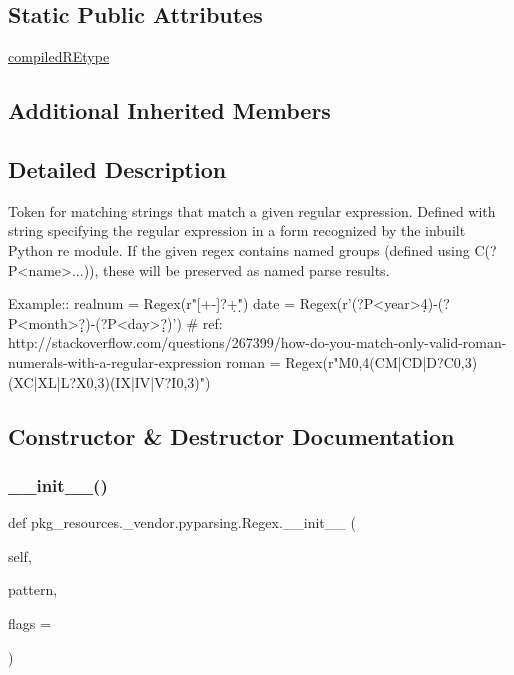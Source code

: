 \subsection*{Static Public Attributes}
\begin{DoxyCompactItemize}
\item 
\hyperlink{classpkg__resources_1_1__vendor_1_1pyparsing_1_1Regex_acf52ddb23c1ec08f8c580c6e28c49bc5}{compiled\+R\+Etype}
\end{DoxyCompactItemize}
\subsection*{Additional Inherited Members}


\subsection{Detailed Description}
\begin{DoxyVerb}Token for matching strings that match a given regular expression.
Defined with string specifying the regular expression in a form recognized by the inbuilt Python re module.
If the given regex contains named groups (defined using C{(?P<name>...)}), these will be preserved as 
named parse results.

Example::
    realnum = Regex(r"[+-]?\d+\.\d*")
    date = Regex(r'(?P<year>\d{4})-(?P<month>\d\d?)-(?P<day>\d\d?)')
    # ref: http://stackoverflow.com/questions/267399/how-do-you-match-only-valid-roman-numerals-with-a-regular-expression
    roman = Regex(r"M{0,4}(CM|CD|D?C{0,3})(XC|XL|L?X{0,3})(IX|IV|V?I{0,3})")
\end{DoxyVerb}
 

\subsection{Constructor \& Destructor Documentation}
\mbox{\label{classpkg__resources_1_1__vendor_1_1pyparsing_1_1Regex_a344d143fdcdc1ff4aef98404422781f1}} 
\subsubsection{\texorpdfstring{\+\_\+\+\_\+init\+\_\+\+\_\+()}{\_\_init\_\_()}}
{\footnotesize\ttfamily def pkg\+\_\+resources.\+\_\+vendor.\+pyparsing.\+Regex.\+\_\+\+\_\+init\+\_\+\+\_\+ (\begin{DoxyParamCaption}\item[{}]{self,  }\item[{}]{pattern,  }\item[{}]{flags = {} }\end{DoxyParamCaption})}


